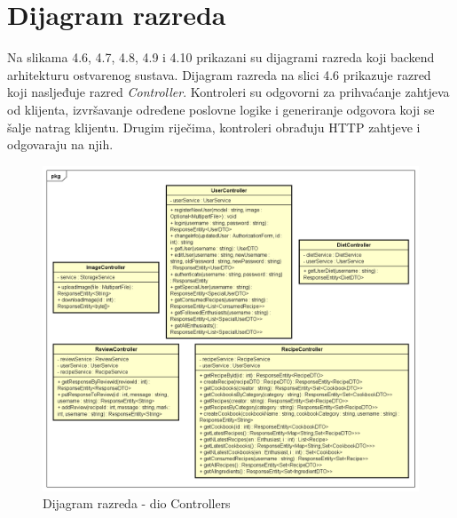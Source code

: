 				\eject	
	
	  \section{Dijagram razreda}
	  
	  Na slikama 4.6, 4.7, 4.8, 4.9 i 4.10 prikazani su dijagrami razreda koji backend arhitekturu ostvarenog sustava. 
	  Dijagram razreda na slici 4.6 prikazuje razred koji nasljeđuje razred \textit{Controller}.  Kontroleri su odgovorni za prihvaćanje zahtjeva od klijenta, izvršavanje određene poslovne logike i generiranje odgovora koji se šalje natrag klijentu. Drugim riječima, kontroleri obrađuju HTTP zahtjeve i odgovaraju na njih.
	  
	  \begin{figure}[H]
			\includegraphics[scale=0.5]{dijagrami/UML_dijagram_razreda_controllers.png} %
			\centering
			\caption{Dijagram razreda - dio Controllers}
			\label{Dijagram razreda - dio Controllers}
		\end{figure}
			
			
			\eject 	
			
